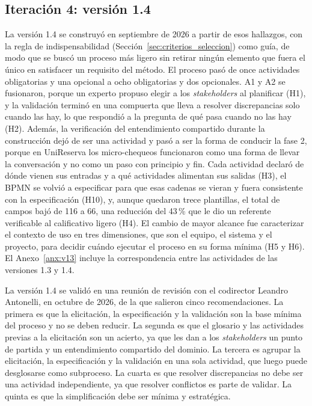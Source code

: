 \documentclass[12pt,letterpaper,oneside]{report}
\begin{document}
\subsection{Iteración 4: versión 1.4}
\label{sec:v14}
La versión 1.4 se construyó en septiembre de 2026 a partir de esos hallazgos, con
la regla de indispensabilidad (Sección~\ref{sec:criterios_seleccion}) como
guía, de modo que se buscó un proceso más
ligero sin retirar ningún elemento que fuera el único en satisfacer un requisito
del método. El proceso pasó de once actividades obligatorias y una opcional a
ocho obligatorias y dos opcionales. A1 y A2 se fusionaron, porque un experto propuso elegir a los
\textit{stakeholders} al planificar (H1), y la validación terminó en una
compuerta que lleva a resolver discrepancias solo cuando las hay, lo que
respondió a la pregunta de qué pasa cuando no las hay (H2). Además, la
verificación del entendimiento compartido durante la construcción dejó de ser una actividad
y pasó a ser la forma de conducir la fase 2, porque en UniReserva los
micro-chequeos funcionaron como una forma de llevar la conversación y no como
un paso con principio y fin. Cada actividad declaró de dónde vienen sus entradas y a qué actividades
alimentan sus salidas (H3), el BPMN se volvió a especificar para que esas
cadenas se vieran y fuera consistente con la especificación (H10), y, aunque quedaron
trece plantillas, el total de campos bajó de 116 a 66, una reducción del 43\,\%
que le dio un referente verificable al calificativo ligero (H4). El cambio de
mayor alcance fue caracterizar el contexto de uso en tres dimensiones, que son
el equipo, el sistema y el proyecto, para decidir cuándo ejecutar el proceso en
su forma mínima (H5 y H6). El
Anexo~\ref{anx:v13} incluye la correspondencia entre las actividades de las
versiones 1.3 y 1.4.

La versión 1.4 se validó en una reunión de revisión con el codirector Leandro
Antonelli, en octubre de 2026, de la que salieron cinco recomendaciones. La
primera es que la elicitación, la especificación y la validación son la base
mínima del proceso y no se deben reducir. La segunda es que el glosario y las
actividades previas a la elicitación son un acierto, ya que les dan a los
\textit{stakeholders} un punto de partida y un entendimiento compartido del dominio.
La tercera es agrupar la elicitación, la especificación y la validación en una
sola actividad, que luego puede desglosarse como subproceso. La cuarta es que
resolver discrepancias no debe ser una actividad independiente, ya que resolver
conflictos es parte de validar. La quinta es que la simplificación debe ser
mínima y estratégica.
\end{document}
